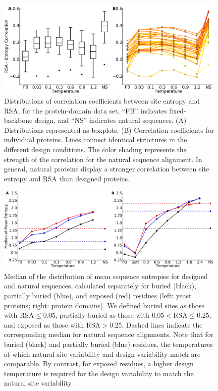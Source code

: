 \documentclass[12pt]{article}
\begin{document}
\begin{figure}[H]
\centerline{\includegraphics[width = 6in]{figures/Cor_Mean_Entropy_RSA_Combination_Plot.pdf}}
\caption{Distributions of correlation coefficients between site entropy and RSA, for the protein-domain data set. ``FB'' indicates fixed-backbone design, and ``NS'' indicates natural sequences. (A) Distributions represented as boxplots. (B) Correlation coefficients for individual proteins. Lines connect identical structures in the different design conditions. The color shading represents the strength of the correlation for the natural sequence alignment. In general, natural proteins display a stronger correlation between site entropy and RSA than designed proteins.}
\label{Correlation_figure}
\end{figure}


\begin{figure}[H]
\centerline{\includegraphics[width = 6in]{figures/Mean_Entropy_Position_Lineplot_Combo.pdf}}
\caption{Median of the distribution of mean sequence entropies for designed and natural sequences, calculated separately for buried (black), partially buried (blue), and exposed (red) residues (left: yeast proteins; right: protein domains). We defined buried sites as those with $\text{RSA}\leq 0.05$, partially buried as those with $0.05<\text{RSA}\leq0.25$, and exposed as those with $\text{RSA}>0.25$. Dashed lines indicate the corresponding median for natural sequence alignments. Note that for buried (black) and partially buried (blue) residues, the temperatures at which natural site variability and design variability match are comparable. By contrast, for exposed residues, a higher design temperature is required for the design variability to match the natural site variability.}
\label{Mean_Entropy_Surface_Core}
\end{figure}
\end{document}
